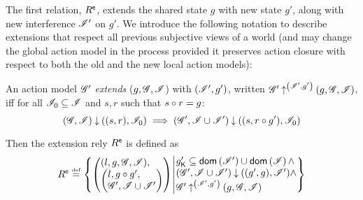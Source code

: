 The first relation, $R^{\textsf{e}}$, extends the shared state $g$ with new
state $g'$, along with new interference $\mathscr{I}'$ on $g'$. We introduce
the following notation to describe extensions that respect all
previous subjective views of a world (and may change the global action
model in the process provided it preserves action closure with respect
to both the old and the new local action models):
\begin{definition}\label{def:amodExtension}
An action model $\mathscr{G}'$ \emph{extends} ($g, \mathscr{G}, \mathscr{I}$) with
$(\mathscr{I}', g')$, written
$\mathscr{G}' \mathbin{\uparrow}^{\left(\mathscr{I}', g'\right)} (g, \mathscr{G}, \mathscr{I})$, iff for all
$\mathscr{I}_0 \subseteq \mathscr{I}$ and $s, r$ such that $s \circ r = g$:
\[
(\mathscr{G}, \mathscr{I}) \mathbin{\downarrow} ((s, r), \mathscr{I}_0) \implies (\mathscr{G}', \mathscr{I} \cup \mathscr{I}') \mathbin{\downarrow} ((s, r\circ g'), \mathscr{I}_0)
\]
\end{definition}
Then the extension rely $R^{\textsf{e}}$ is defined as
\[
  \extendR \eqdef
  \left\{
  \begin{array}{@{} l @{\hspace*{2pt}} | @{\hspace*{2pt}} r @{}}
    \left(
    \begin{array}{@{} l @{}}
      (l , g, \gmod, \lmod),\\
      \left(
      \begin{array}{@{} l @{}}
	l,
	g \composeL g',\\
	\gmod', \lmod \cup \lmod'
      \end{array}
      \right)
    \end{array}
    \right)
    &
    \begin{array}{@{} l @{}}
      \capPart{g'} \subseteq \dom{\lmod'} \cup \dom{\lmod} \land \\
      \extendsAM{\gmod', \lmod \cup \lmod'}{g'}{g}{\lmod'} \land \\
      \expandsAM{\gmod'}{\lmod'}{g'}{g}{\gmod}{\lmod}
    \end{array}
  \end{array}
  \right\}
\]


